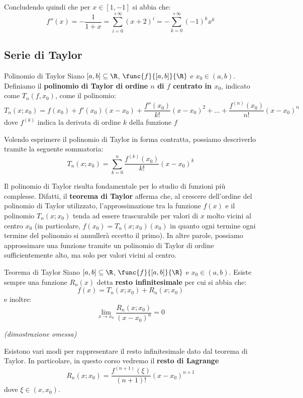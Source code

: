 \documentclass[a4paper, 12pt]{report}
\begin{document}
    Concludendo quindi che per $x \in [1, -1]$ si abbia che:
    \[f''(x) = - \frac{1}{1+x} = \sum_{i = 0}^{+\infty} (x+2)^{i} = -\sum_{k = 0}^{+\infty} (-1)^{k} x^k \]

    \subsection{Serie di Taylor}
    
    \begin{frameddefn}{Polinomio di Taylor}
        Siano $[a,b] \subseteq \R$, $\func{f}{[a,b]}{\R}$ e $x_0 \in (a,b)$. Definiamo il \textbf{polinomio di Taylor di ordine $n$ di $f$ centrato in $x_0$}, indicato come $T_n(f, x_0)$, come il polinomio:
        \[T_n(x;x_0) = f(x_0) + f'(x_0) (x-x_0) + \frac{f''(x_0)}{k!}(x-x_0)^2 + \ldots + \frac{f^{(n)}(x_0)}{n!} (x-x_0)^{n}\]
        dove $f^{(k)}$ indica la derivata di ordine $k$ della funzione $f$
    \end{frameddefn}

    Volendo esprimere il polinomio di Taylor in forma contratta, possiamo descriverlo tramite la seguente sommatoria:
    \[T_n(x;x_0) = \sum_{k = 0}^n \frac{f^{(k)}(x_0)}{k!} (x-x_0)^{k} \]
    
    Il polinomio di Taylor risulta fondamentale per lo studio di funzioni più complesse. Difatti, il \textbf{teorema di Taylor} afferma che, al crescere dell'ordine del polinomio di Taylor utilizzato, l'approssimazione tra la funzione $f(x)$ e il polinomio $T_n(x;x_0)$ tenda ad essere trascurabile per valori di $x$ molto vicini al centro $x_0$ (in particolare, $f(x_0) = T_n(x; x_0)(x_0)$ in quanto ogni termine ogni termine del polinomio si annullerà eccetto il primo). In altre parole, possiamo approssimare una funzione tramite un polinomio di Taylor di ordine sufficientemente alto, ma solo per valori vicini al centro.

    \begin{framedthm}{Teorema di Taylor}
        Siano $[a,b] \subseteq \R$, $\func{f}{[a,b]}{\R}$ e $x_0 \in (a,b)$. Esiste sempre una funzione $R_n(x)$ detta \textbf{resto infinitesimale} per cui si abbia che:
        \[f(x) = T_n(x;x_0) + R_n(x; x_0)\]
        e inoltre:
        \[\lim_{x \to x_0} \frac{R_n(x; x_0)}{(x-x_0)^n} = 0\]

        \textit{(dimostrazione omessa)}
    \end{framedthm}

    Esistono vari modi per rappresentare il resto infinitesimale dato dal teorema di Taylor. In particolare, in questo corso vedremo il \textbf{resto di Lagrange}
    \[R_n(x; x_0) = \frac{f^{(n+1)}(\xi)}{(n+1)!} (x-x_0)^{n+1}\]
    dove $\xi \in (x, x_0)$.
\end{document}
